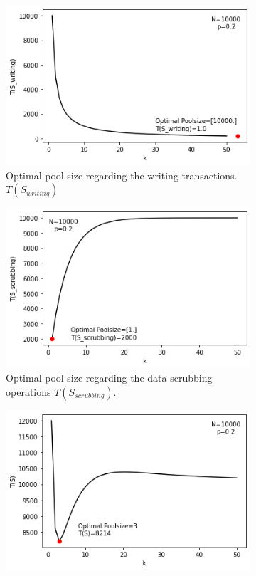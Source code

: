 \begin{figure}[H]%
    \centering
        \begin{subfigure}{6cm}
        \includegraphics[width=\linewidth]{graphics/expected_cost.png}
        \caption{Optimal pool size regarding the writing transactions. $T(S_{writing})$}\label{fig:expected_cost}
    \end{subfigure}
    \qquad
    \begin{subfigure}{6cm}
        \includegraphics[width=\linewidth]{graphics/expected_scrubbing.png}
        \caption{Optimal pool size regarding the data scrubbing operations $T(S_{scrubbing})$.}\label{fig:expected_scrubbing}
    \end{subfigure}
    \qquad
    \begin{subfigure}{6cm}
        \includegraphics[width=\linewidth]{graphics/expected_operations.png}

\end{subfigure}
\end{figure}
